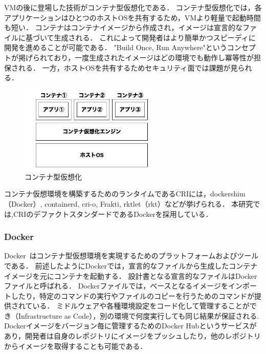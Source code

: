 VMの後に登場した技術がコンテナ型仮想化である．
コンテナ型仮想化では，各アプリケーションはひとつのホストOSを共有するため，VMより軽量で起動時間も短い．
コンテナはコンテナイメージから作成され，イメージは宣言的なファイルに基づいて生成される．
これによって開発者はより簡単かつスピーディに開発を進めることが可能である．
"Build Once, Run Anywhere"というコンセプトが掲げられており，一度生成されたイメージはどの環境でも動作し冪等性が担保される．
一方，ホストOSを共有するためセキュリティ面では課題が見られる．

\begin{figure}[htbp]
\begin{center}
    \includegraphics[width=0.6\textwidth]{./figures/docker-structure.jpg}
    \caption{コンテナ型仮想化}
\end{center}
\end{figure}

コンテナ仮想環境を構築するためのランタイムであるCRIには，dockershim（Docker）, containerd, cri-o, Frakti, rktlet（rkt）などが挙げられる．
本研究では,CRIのデファクトスタンダードであるDockerを採用している．

\subsubsection{Docker}
\label{background:container-orchestration-system:container:docker}

Docker~\cite{Docker}はコンテナ型仮想環境を実現するためのプラットフォームおよびツールである．
前述したようにDockerでは，宣言的なファイルから生成したコンテナイメージを元にコンテナを起動する．
設計書となる宣言的なファイルはDockerファイルと呼ばれる．
Dockerファイルでは，ベースとなるイメージをインポートしたり，特定のコマンドの実行やファイルのコピーを行うためのコマンドが提供されている．
ミドルウェアや各種環境設定をコード化して管理することができ（Infrastructure as Code），別の環境で何度実行しても同じ結果が保証される.
Dockerイメージをバージョン毎に管理するためのDocker Hubというサービスがあり，開発者は自身のレポジトリにイメージをプッシュしたり，他のレポジトリからイメージを取得することも可能である．

